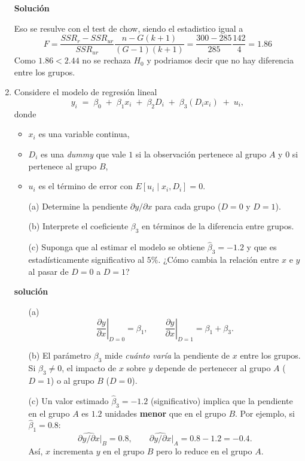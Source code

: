 \documentclass[10pt,a4paper]{article}
\begin{document}
\begin{enumerate}
\textbf{Solución}

Eso se resulve con el test de chow, siendo el estadistico igual a 
$$F = \frac{SSR_r-SSR_{ur}}{SSR_{ur}}\frac{n-G(k+1)}{(G-1)(k+1)}=\frac{300-285}{285}\frac{142}{4}=1.86$$
Como $1.86<2.44$ no se rechaza $H_0$ y podriamos decir que no hay diferencia entre los grupos.



\item Considere el modelo de regresión lineal
\[
y_i \;=\; \beta_0 \;+\; \beta_1 x_i \;+\; \beta_2 D_i \;+\; \beta_3 (D_i x_i) \;+\; u_i,
\]
donde
\begin{itemize}
  \item $x_i$ es una variable continua,
  \item $D_i$ es una \emph{dummy} que vale $1$ si la observación pertenece al grupo $A$ y $0$ si pertenece al grupo $B$,
  \item $u_i$ es el término de error con $E[u_i \mid x_i,D_i]=0$.
\end{itemize}

\begin{enumerate}
  \item[(a)] Determine la pendiente $\partial y / \partial x$ para cada grupo ($D=0$ y $D=1$).
  \item[(b)] Interprete el coeficiente $\beta_3$ en términos de la diferencia entre grupos.
  \item[(c)] Suponga que al estimar el modelo se obtiene $\widehat{\beta}_3=-1.2$ y que es estadísticamente significativo al $5\%$.  
        ¿Cómo cambia la relación entre $x$ e $y$ al pasar de $D=0$ a $D=1$?
\end{enumerate}


\textbf{solución}
\begin{enumerate}
  \item[(a)] 
    \[
      \left.\frac{\partial y}{\partial x}\right|_{D=0} = \beta_1, 
      \qquad
      \left.\frac{\partial y}{\partial x}\right|_{D=1} = \beta_1 + \beta_3.
    \]
  \item[(b)] El parámetro $\beta_3$ mide \emph{cuánto varía} la pendiente de $x$ entre los grupos.  
        Si $\beta_3 \neq 0$, el impacto de $x$ sobre $y$ depende de pertenecer al grupo $A$ ($D=1$) o al grupo $B$ ($D=0$).
  \item[(c)] Un valor estimado $\widehat{\beta}_3=-1.2$ (significativo) implica que la pendiente en el grupo $A$ es $1.2$ unidades \textbf{menor} que en el grupo $B$.  
        Por ejemplo, si $\widehat{\beta}_1 = 0.8$:
        \[
          \widehat{\partial y/\partial x}\big|_{B} = 0.8, 
          \qquad
          \widehat{\partial y/\partial x}\big|_{A} = 0.8 - 1.2 = -0.4.
        \]
        Así, \(x\) incrementa \(y\) en el grupo \(B\) pero lo reduce en el grupo \(A\).
\end{enumerate}

\end{enumerate}




    
\end{document}
